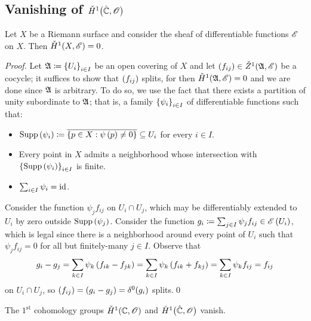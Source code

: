 \documentclass[../Moduli_Spaces_of_Riemann_Surfaces.tex]{subfiles}
\begin{document}
    \subsection{Vanishing of $\check{H}^1\big(\hat{\mathbb{C}},\mathscr{O}\big)$}
    \begin{lemma}\label{CC:lem:vanishing_of_sheaf_differentiable}
        Let $X$ be a Riemann surface and consider the sheaf of differentiable functions $\mathscr{E}$ on $X$. Then $\check{H}^1\!\left(X,\mathscr{E}\right)=0$.
    \end{lemma}
    \begin{proof}
        Let $\mathfrak{A}\coloneqq\left\{U_i\right\}_{i\in I}$ be an open covering of $X$ and let $\left(f_{ij}\right)\in\check{Z}^1\!\left(\mathfrak{A},\mathscr{E}\right)$ be a cocycle; it suffices to show that $\left(f_{ij}\right)$ splits, for then $\check{H}^1\!\left(\mathfrak{A},\mathscr{E}\right)=0$ and we are done since $\mathfrak{A}$ is arbitrary. To do so, we use the fact that there exists a partition of unity subordinate to $\mathfrak{A}$; that is, a family $\left\{\psi_i\right\}_{i\in I}$ of differentiable functions such that:
        \begin{itemize}
            \item $\operatorname{Supp}\left(\psi_i\right)\coloneqq\overline{\left\{p\in X:\psi\left(p\right)\neq0\right\}}\subseteq U_i$ for every $i\in I$.
                \vspace{-0.05in}
            \item Every point in $X$ admits a neighborhood whose intersection with $\left\{\operatorname{Supp}\left(\psi_i\right)\right\}_{i\in I}$ is finite.
                \vspace{-0.05in}
            \item $\sum_{i\in I}\psi_i=\operatorname{id}$.
        \end{itemize}
        Consider the function $\psi_jf_{ij}$ on $U_i\cap U_j$, which may be differentiably extended to $U_i$ by zero outside $\operatorname{Supp}\left(\psi_j\right)$. Consider the function $g_i\coloneqq\sum_{j\in I}\psi_jf_{ij}\in\mathscr{E}\left(U_i\right)$, which is legal since there is a neighborhood around every point of $U_i$ such that $\psi_jf_{ij}=0$ for all but finitely-many $j\in I$. Observe that
        \begin{equation*}
            g_i-g_j=\sum_{k\in I}\psi_k\left(f_{ik}-f_{jk}\right)=\sum_{k\in I}\psi_k\left(f_{ik}+f_{kj}\right)=\sum_{k\in I}\psi_kf_{ij}=f_{ij}
        \end{equation*}
        on $U_i\cap U_j$, so $\left(f_{ij}\right)=\left(g_i-g_j\right)=\delta^0\!\left(g_i\right)$ splits.\qed
    \end{proof}
    \begin{theorem}\label{CC:thm:vanishing_of_H_Riemann_sphere}
        The $1^\textrm{st}$ cohomology groups $\check{H}^1\!\left(\mathbb{C},\mathscr{O}\right)$ and $\check{H}^1\big(\hat{\mathbb{C}},\mathscr{O}\big)$ vanish.
    \end{theorem}
\end{document}
